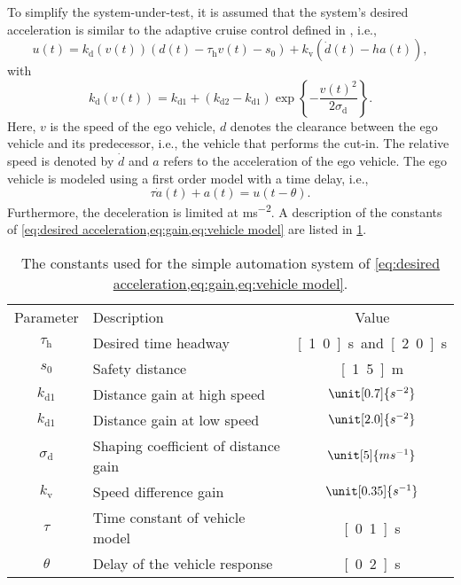 To simplify the system-under-test, it is assumed that the system's desired acceleration is similar to the adaptive cruise control defined in \cite{deGelder2017assessment}, i.e.,
\begin{equation}
	\label{eq:desired acceleration} 
	u(t) = k_{\mathrm{d}}(v(t))(d(t) - \tau_{\mathrm{h}} v(t) - s_0) + k_{\mathrm{v}}\left(\dot{d}(t) - ha(t) \right),
\end{equation}
with
\begin{equation}
	\label{eq:gain}
	k_{\mathrm{d}}(v(t)) = k_{\mathrm{d1}} + \left( k_{\mathrm{d2}} - k_{\mathrm{d1}} \right) \exp \left\{ -\frac{v(t)^2}{2\sigma_{\mathrm{d}}} \right\}.
\end{equation}
Here, $v$ is the speed of the ego vehicle, $d$ denotes the clearance between the ego vehicle and its predecessor, i.e., the vehicle that performs the cut-in. The relative speed is denoted by $\dot{d}$ and $a$ refers to the acceleration of the ego vehicle. The ego vehicle is modeled using a first order model with a time delay, i.e.,
\begin{equation}
	\label{eq:vehicle model}
	\tau \dot{a}(t) + a(t) = u(t - \theta).
\end{equation}
Furthermore, the deceleration is limited at \unit[-6]{ms^{-2}}. A description of the constants of \cref{eq:desired acceleration,eq:gain,eq:vehicle model} are listed in \cref{tab:constants}.

\begin{table}
	\centering
	\caption{The constants used for the simple automation system of \cref{eq:desired acceleration,eq:gain,eq:vehicle model}.}
	\label{tab:constants}
	\begin{tabular}{clc}
		\toprule
		Parameter & Description & Value \\ \otoprule
		$\tau_{\mathrm{h}}$ & Desired time headway & \unit[1.0]{s} and \unit[2.0]{s} \\
		$s_0$ & Safety distance & \unit[1.5]{m} \\
		$k_{\mathrm{d1}}$ & Distance gain at high speed & $\unit[0.7]{s^{-2}}$ \\
		$k_{\mathrm{d1}}$ & Distance gain at low speed & $\unit[2.0]{s^{-2}}$ \\
		$\sigma_{\mathrm{d}}$ & Shaping coefficient of distance gain & $\unit[5]{ms^{-1}}$ \\
		$k_{\mathrm{v}}$ & Speed difference gain & $\unit[0.35]{s^{-1}}$ \\
		$\tau$ & Time constant of vehicle model & \unit[0.1]{s} \\
		$\theta$ & Delay of the vehicle response & \unit[0.2]{s} \\
		\bottomrule
	\end{tabular}
\end{table}

